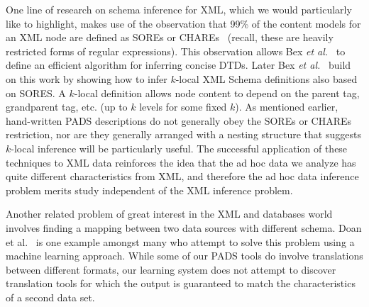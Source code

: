 One line of research on schema inference for XML, which we would
particularly like to highlight, makes use of the 
observation that 99\% of the content models for an XML node are defined as
SOREs or CHAREs~\cite{martens+:expressiveness-xml-schema} (recall, these
are heavily restricted forms of regular expressions).  
This observation allows Bex {\em et al.}~\cite{bex+:dtd-inference} to define
an efficient algorithm for inferring concise DTDs.  Later 
Bex {\em et al.}~\cite{bex+:inferring-xml-schema} build on this work 
by showing how to infer $k$-local XML Schema definitions also based on
SORES.  A $k$-local definition allows node content to depend on the parent
tag, grandparent tag, etc. (up to $k$ levels for some fixed $k$).
As mentioned earlier, hand-written PADS descriptions do not generally obey
the SOREs or CHAREs restriction, nor are they generally arranged with a nesting
structure that suggests $k$-local inference will be particularly useful.
The successful application of these techniques to XML data reinforces 
the idea that the ad hoc data we analyze has quite different characteristics
from XML, and therefore the ad hoc data inference problem merits study
independent of the XML inference problem.

Another related problem of great interest in the XML and databases world
involves finding a mapping between two data sources with different schema.
Doan et al.~\cite{doan+:disparate-data-sources} is one example amongst
many who attempt to solve this problem using a machine learning approach.
While some of our PADS tools do involve translations between
different formats, our learning system does not attempt to discover
translation tools for which the output is guaranteed to match 
the characteristics of a second data set.